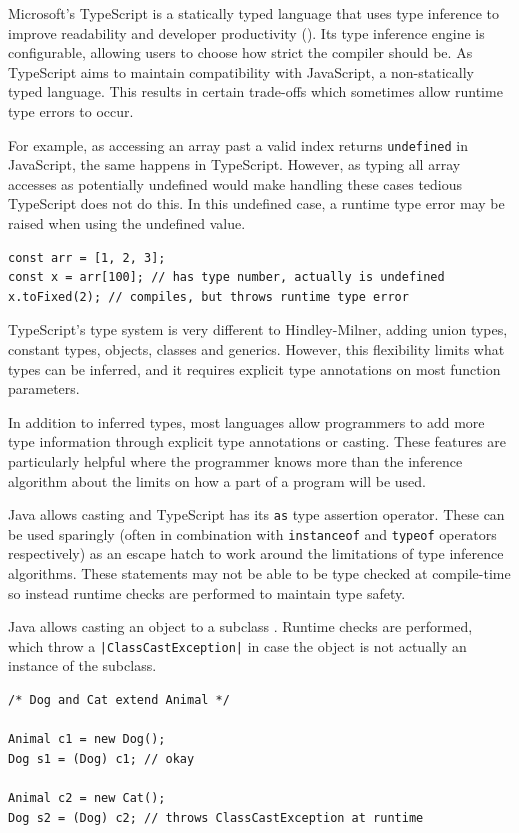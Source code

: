 \documentclass[a4paper,fleqn,oneside,12pt]{report}
\begin{document}
Microsoft's TypeScript is a statically typed language that uses type inference to improve readability and developer productivity (\cite{ref36}). Its type inference engine is configurable, allowing users to choose how strict the compiler should be. As TypeScript aims to maintain compatibility with JavaScript, a non-statically typed language. This results in certain trade-offs which sometimes allow runtime type errors to occur.

For example, as accessing an array past a valid index returns \texttt{undefined} in JavaScript, the same happens in TypeScript. However, as typing all array accesses as potentially undefined would make handling these cases tedious TypeScript does not do this. In this undefined case, a runtime type error may be raised when using the undefined value.

\begin{verbatim}
const arr = [1, 2, 3];
const x = arr[100]; // has type number, actually is undefined
x.toFixed(2); // compiles, but throws runtime type error
\end{verbatim}

TypeScript's type system is very different to Hindley-Milner, adding union types, constant types, objects, classes and generics. However, this flexibility limits what types can be inferred, and it requires explicit type annotations on most function parameters.

In addition to inferred types, most languages allow programmers to add more type information through explicit type annotations or casting. These features are particularly helpful where the programmer knows more than the inference algorithm about the limits on how a part of a program will be used.

Java allows casting and TypeScript has its \texttt{as} type assertion operator. These can be used sparingly (often in combination with \texttt{instanceof} and \texttt{typeof} operators respectively) as an escape hatch to work around the limitations of type inference algorithms. These statements may not be able to be type checked at compile-time so instead runtime checks are performed to maintain type safety.

Java allows casting an object to a subclass \citep{ref25}. Runtime checks are performed, which throw a \texttt{|ClassCastException|} in case the object is not actually an instance of the subclass.

\begin{verbatim}
/* Dog and Cat extend Animal */

Animal c1 = new Dog();
Dog s1 = (Dog) c1; // okay

Animal c2 = new Cat();
Dog s2 = (Dog) c2; // throws ClassCastException at runtime
\end{verbatim}
\end{document}
